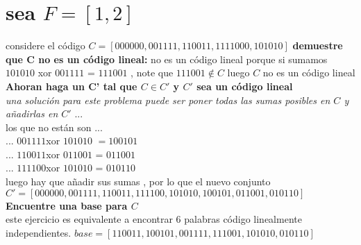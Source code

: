 \documentclass[10pt,a4paper]{article} %
\begin{document}
        \section{sea $F = [1,2]$ }considere el código $C = [ 000000 , 001111 ,
        110011 , 1111000 , 101010]$
        \textbf{demuestre que C no es un código lineal:}
            no es un código lineal  porque si sumamos $101010$ xor $001111$  =
        $111001$ , note que $111001 \notin C$ luego $C$ no es un código lineal
        \\
        \textbf{Ahoran haga un C' tal que $C \in C'$ y $C'$ sea un código lineal}
        \\
        \textit{una solución para este problema puede ser poner todas las sumas
        posibles en $C$ y añadirlas en $C'$} ...
        \\
        los que no están son ...
        \\
        ... $001111 $xor $101010$ $=100101$
        \\
        ... $110011 $xor $011001$ = $011001$
        \\
        ... $111100 $xor $101010$ = $010110$
        \\
        luego hay que añadir sus sumas  , por lo que el nuevo conjunto $C' =
        [000000, 001111, 110011 , 111100 , 101010 , 100101 , 011001 , 010110 ]$
        \textbf{Encuentre una base para $C$}
        \\
        este ejercicio es equivalente a encontrar 6 palabras código linealmente
        independientes.
        $base  = [110011 , 100101 , 001111  , 111001 , 101010 , 010110]$





















    \nocite{*}
    
    
\end{document}
